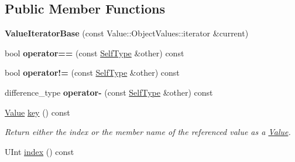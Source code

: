 \subsection*{Public Member Functions}
\begin{DoxyCompactItemize}
\item 
\hypertarget{class_json_1_1_value_iterator_base_a640e990e5f03a96fd650122a2906f59d}{{\bfseries Value\-Iterator\-Base} (const Value\-::\-Object\-Values\-::iterator \&current)}\label{class_json_1_1_value_iterator_base_a640e990e5f03a96fd650122a2906f59d}

\item 
\hypertarget{class_json_1_1_value_iterator_base_afc656672ac28502f640ade32c38c1b56}{bool {\bfseries operator==} (const \hyperlink{class_json_1_1_value_iterator_base}{Self\-Type} \&other) const }\label{class_json_1_1_value_iterator_base_afc656672ac28502f640ade32c38c1b56}

\item 
\hypertarget{class_json_1_1_value_iterator_base_a18c2dd42e0bb989ace141bfe9de52792}{bool {\bfseries operator!=} (const \hyperlink{class_json_1_1_value_iterator_base}{Self\-Type} \&other) const }\label{class_json_1_1_value_iterator_base_a18c2dd42e0bb989ace141bfe9de52792}

\item 
\hypertarget{class_json_1_1_value_iterator_base_ab786787fcad68ca5e8745aaf520fa17f}{difference\-\_\-type {\bfseries operator-\/} (const \hyperlink{class_json_1_1_value_iterator_base}{Self\-Type} \&other) const }\label{class_json_1_1_value_iterator_base_ab786787fcad68ca5e8745aaf520fa17f}

\item 
\hypertarget{class_json_1_1_value_iterator_base_aa2ff5e79fc96acd4c3cd288e92614fc7}{\hyperlink{class_json_1_1_value}{Value} \hyperlink{class_json_1_1_value_iterator_base_aa2ff5e79fc96acd4c3cd288e92614fc7}{key} () const }\label{class_json_1_1_value_iterator_base_aa2ff5e79fc96acd4c3cd288e92614fc7}

\begin{DoxyCompactList}\small\item\em Return either the index or the member name of the referenced value as a \hyperlink{class_json_1_1_value}{Value}. \end{DoxyCompactList}\item 
\hypertarget{class_json_1_1_value_iterator_base_aa90591f5f7f8d2f06cc4605816b53738}{U\-Int \hyperlink{class_json_1_1_value_iterator_base_aa90591f5f7f8d2f06cc4605816b53738}{index} () const }\label{class_json_1_1_value_iterator_base_aa90591f5f7f8d2f06cc4605816b53738}


\end{DoxyCompactItemize}
